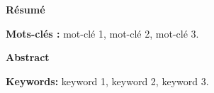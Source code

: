 \newpage
\thispagestyle{fancy}

\begin{center}
  {\large\bfseries Résumé}
\end{center}
\vspace{0.4em}


\vspace{0.8em}
\noindent\textbf{Mots-clés :} mot-clé 1, mot-clé 2, mot-clé 3.

\vspace{2em}

\begin{otherlanguage}{english}
\begin{center}
  {\large\bfseries Abstract}
\end{center}
\vspace{0.4em}


\vspace{0.8em}
\noindent\textbf{Keywords:} keyword 1, keyword 2, keyword 3.
\end{otherlanguage}
